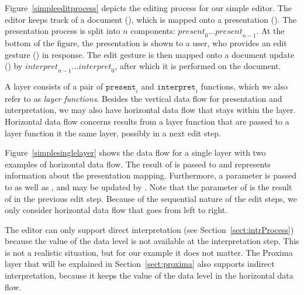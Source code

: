 \documentclass[preprint,natbib]{sigplanconf}
\begin{document}
Figure~\ref{simpleeditprocess} depicts the editing process for our simple editor. The editor keeps track of a document (), which is mapped onto a presentation (). The presentation process is split into $n$ components: $\mathit{present}_0 \dots \mathit{present}_{n-1}$. At the bottom of the figure, the presentation is shown to a user, who provides an edit gesture () in response. The edit gesture is then mapped onto a document update () by $\mathit{interpret}_{n-1} \dots \mathit{interpret}_0$, after which it is performed on the document.


A layer consists of a pair of $\mathtt{present}_i$ and $\mathtt{interpret}_i$ functions, which we also refer to as {\em layer functions}. Besides the vertical data flow for presentation and interpretation, we may also have horizontal data flow that stays within the layer. Horizontal data flow concerns results from a layer function that are passed to a layer function it the same layer, possibly in a next edit step.

Figure~\ref{simplesinglelayer} shows the data flow for a single layer with two examples of horizontal data flow. The  result of  is passed to  and represents information about the presentation mapping. Furthermore, a  parameter is passed to  as well as , and may be updated by . Note that the  parameter of  is the result of  in the previous edit step. Because of the sequential nature of the edit steps, we only consider horizontal data flow that goes from left to right.

The editor can only support direct interpretation (see Section~\ref{sect:intrProcess}) because the value of the data level is not available at the interpretation step. This is not a realistic situation, but for our example it does not matter. The Proxima layer that will be explained in Section~\ref{sect:proxima} also supports indirect interpretation, because it keeps the value of the data level in the horizontal data flow.

\end{document}

